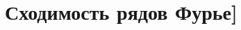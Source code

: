 \documentclass[../main.tex]{subfiles}
\begin{document}
 \chapter{Сходимость рядов Фурье]}
 
\end{document}
